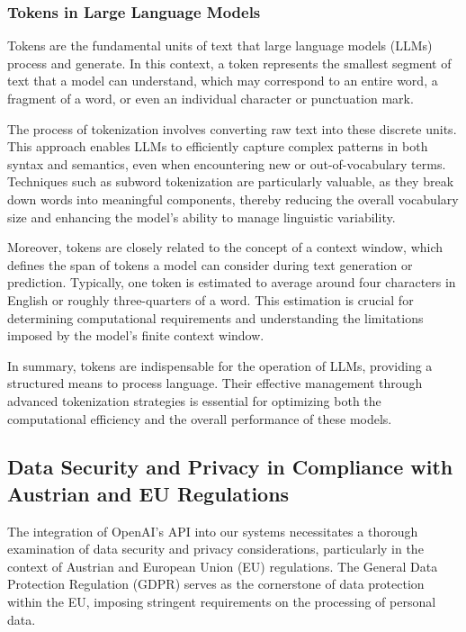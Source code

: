 \cite{OpenAI-API-Documentation}

\subsubsection{Tokens in Large Language Models}

Tokens are the fundamental units of text that large language models (LLMs) process and generate. 
In this context, a token represents the smallest segment of text that a model can understand, which may correspond to an entire word, 
a fragment of a word, or even an individual character or punctuation mark. 

The process of tokenization involves converting raw text into these discrete units. 
This approach enables LLMs to efficiently capture complex patterns in both syntax and semantics, even when encountering new or out-of-vocabulary terms. 
Techniques such as subword tokenization are particularly valuable, as they break down words into meaningful components, 
thereby reducing the overall vocabulary size and enhancing the model's ability to manage linguistic variability.

Moreover, tokens are closely related to the concept of a context window, which defines the span of tokens a model can consider during text generation or prediction. 
Typically, one token is estimated to average around four characters in English or roughly three-quarters of a word. 
This estimation is crucial for determining computational requirements and understanding the limitations imposed by the model’s finite context window.

In summary, tokens are indispensable for the operation of LLMs, providing a structured means to process language. 
Their effective management through advanced tokenization strategies is essential for optimizing both the computational efficiency and the overall performance 
of these models.

\cite{understanding-tokens-context-window-llms}


\subsection{Data Security and Privacy in Compliance with Austrian and EU Regulations}

The integration of OpenAI's API into our systems necessitates a thorough examination of data security and privacy considerations, 
particularly in the context of Austrian and European Union (EU) regulations. 
The General Data Protection Regulation (GDPR) serves as the cornerstone of data protection within the EU, imposing stringent requirements on the 
processing of personal data.

